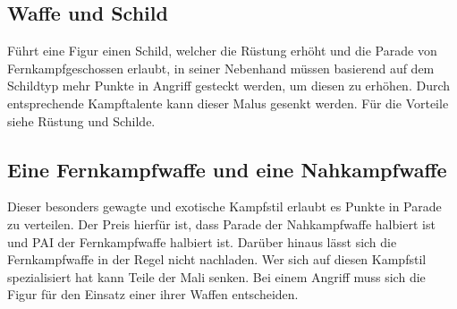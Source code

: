 \documentclass[a4paper,12pt,oneside]{book}
\begin{document}
\subsection{Waffe und Schild}
Führt eine Figur einen Schild, welcher die Rüstung erhöht und die Parade von Fernkampfgeschossen erlaubt, in seiner Nebenhand müssen basierend auf dem Schildtyp mehr Punkte in Angriff gesteckt werden, um diesen zu erhöhen. Durch entsprechende Kampftalente kann dieser Malus gesenkt werden. 
Für die Vorteile siehe Rüstung und Schilde.
\subsection{Eine Fernkampfwaffe und eine Nahkampfwaffe}
Dieser besonders gewagte und exotische Kampfstil erlaubt es Punkte in Parade zu verteilen. Der Preis hierfür ist, dass Parade der Nahkampfwaffe halbiert ist und PAI der Fernkampfwaffe halbiert ist. Darüber hinaus lässt
sich die Fernkampfwaffe in der Regel nicht nachladen. Wer sich auf diesen Kampfstil spezialisiert hat kann Teile der Mali senken. Bei einem Angriff muss sich die Figur für den Einsatz einer ihrer Waffen entscheiden.
\end{document}

